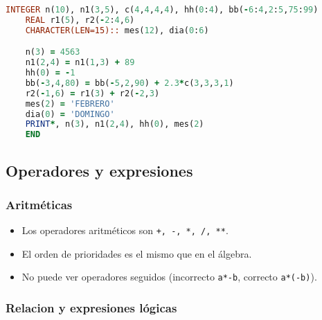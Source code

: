 \begin{lstlisting}[language=Fortran]
	INTEGER n(10), n1(3,5), c(4,4,4,4), hh(0:4), bb(-6:4,2:5,75:99)
	REAL r1(5), r2(-2:4,6)
	CHARACTER(LEN=15):: mes(12), dia(0:6)

	n(3) = 4563
	n1(2,4) = n1(1,3) + 89
	hh(0) = -1
	bb(-3,4,80) = bb(-5,2,90) + 2.3*c(3,3,3,1)
	r2(-1,6) = r1(3) + r2(-2,3)
	mes(2) = 'FEBRERO'
	dia(0) = 'DOMINGO'
	PRINT*, n(3), n1(2,4), hh(0), mes(2)
	END
\end{lstlisting}



\subsection{Operadores y expresiones}

\subsubsection{Aritméticas}

\begin{itemize}
	\item Los operadores aritméticos son {\tt +, -, *, /, **}.
	\item El orden de prioridades es el mismo que en el álgebra.
	\item No puede ver operadores seguidos (incorrecto {\tt a*-b}, correcto {\tt a*(-b)}).
\end{itemize}

\subsubsection{Relacion y expresiones lógicas}

